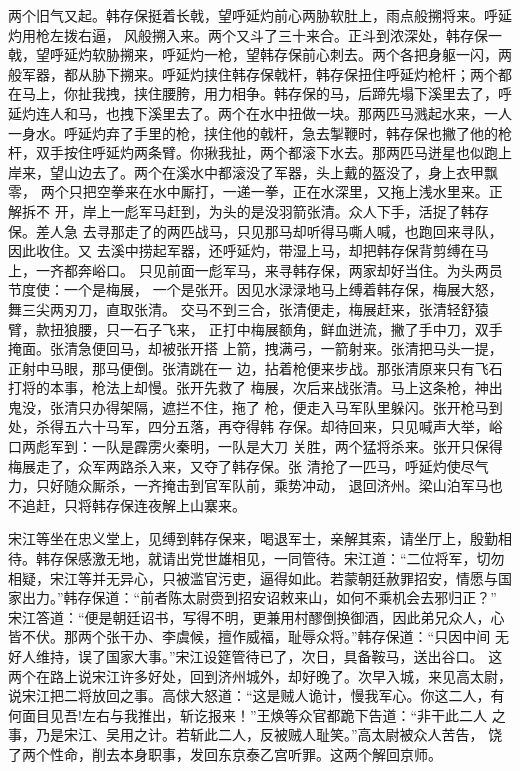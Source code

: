 两个旧气又起。韩存保挺着长戟，望呼延灼前心两胁软肚上，雨点般搠将来。呼延
灼用枪左拨右逼，风般搠入来。两个又斗了三十来合。正斗到浓深处，韩存保一
戟，望呼延灼软胁搠来，呼延灼一枪，望韩存保前心刺去。两个各把身躯一闪，两
般军器，都从胁下搠来。呼延灼挟住韩存保戟杆，韩存保扭住呼延灼枪杆；两个都
在马上，你扯我拽，挟住腰胯，用力相争。韩存保的马，后蹄先塌下溪里去了，呼
延灼连人和马，也拽下溪里去了。两个在水中扭做一块。那两匹马溅起水来，一人
一身水。呼延灼弃了手里的枪，挟住他的戟杆，急去掣鞭时，韩存保也撇了他的枪
杆，双手按住呼延灼两条臂。你揪我扯，两个都滚下水去。那两匹马迸星也似跑上
岸来，望山边去了。两个在溪水中都滚没了军器，头上戴的盔没了，身上衣甲飘零，
两个只把空拳来在水中厮打，一递一拳，正在水深里，又拖上浅水里来。正解拆不
开，岸上一彪军马赶到，为头的是没羽箭张清。众人下手，活捉了韩存保。差人急
去寻那走了的两匹战马，只见那马却听得马嘶人喊，也跑回来寻队，因此收住。又
去溪中捞起军器，还呼延灼，带湿上马，却把韩存保背剪缚在马上，一齐都奔峪口。
只见前面一彪军马，来寻韩存保，两家却好当住。为头两员节度使：一个是梅展，
一个是张开。因见水渌渌地马上缚着韩存保，梅展大怒，舞三尖两刃刀，直取张清。
交马不到三合，张清便走，梅展赶来，张清轻舒猿臂，款扭狼腰，只一石子飞来，
正打中梅展额角，鲜血迸流，撇了手中刀，双手掩面。张清急便回马，却被张开搭
上箭，拽满弓，一箭射来。张清把马头一提，正射中马眼，那马便倒。张清跳在一
边，拈着枪便来步战。那张清原来只有飞石打将的本事，枪法上却慢。张开先救了
梅展，次后来战张清。马上这条枪，神出鬼没，张清只办得架隔，遮拦不住，拖了
枪，便走入马军队里躲闪。张开枪马到处，杀得五六十马军，四分五落，再夺得韩
存保。却待回来，只见喊声大举，峪口两彪军到：一队是霹雳火秦明，一队是大刀
关胜，两个猛将杀来。张开只保得梅展走了，众军两路杀入来，又夺了韩存保。张
清抢了一匹马，呼延灼使尽气力，只好随众厮杀，一齐掩击到官军队前，乘势冲动，
退回济州。梁山泊军马也不追赶，只将韩存保连夜解上山寨来。

宋江等坐在忠义堂上，见缚到韩存保来，喝退军士，亲解其索，请坐厅上，殷勤相
待。韩存保感激无地，就请出党世雄相见，一同管待。宋江道：“二位将军，切勿
相疑，宋江等并无异心，只被滥官污吏，逼得如此。若蒙朝廷赦罪招安，情愿与国
家出力。”韩存保道：“前者陈太尉赍到招安诏敕来山，如何不乘机会去邪归正？”
宋江答道：“便是朝廷诏书，写得不明，更兼用村醪倒换御酒，因此弟兄众人，心
皆不伏。那两个张干办、李虞候，擅作威福，耻辱众将。”韩存保道：“只因中间
无好人维持，误了国家大事。”宋江设筵管待已了，次日，具备鞍马，送出谷口。
这两个在路上说宋江许多好处，回到济州城外，却好晚了。次早入城，来见高太尉，
说宋江把二将放回之事。高俅大怒道：“这是贼人诡计，慢我军心。你这二人，有
何面目见吾!左右与我推出，斩讫报来！”王焕等众官都跪下告道：“非干此二人
之事，乃是宋江、吴用之计。若斩此二人，反被贼人耻笑。”高太尉被众人苦告，
饶了两个性命，削去本身职事，发回东京泰乙宫听罪。这两个解回京师。

